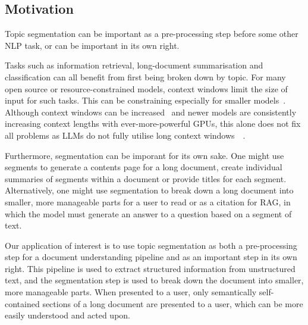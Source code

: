 \subsection{Motivation}

Topic segmentation can be important as a pre-processing step before some other NLP task, or can be important in its own right. 

Tasks such as information retrieval, long-document summarisation and classification can all benefit from first being broken down by topic. For many open source or resource-constrained models, context windows limit the size of input for such tasks. This can be constraining especially for smaller models~\cite{FlanT5}. Although context windows can be increased~\cite{ExtendingContextWindows} and newer models are consistently increasing context lengths with ever-more-powerful GPUs, this alone does not fix all problems as LLMs do not fully utilise long context windows~\cite{EffectOfLongContextWindows}~\cite{ContextAffectsFactual}. 

Furthermore, segmentation can be imporant for its own sake. One might use segments to generate a contents page for a long document, create individual summaries of segments within a document or provide titles for each segment. Alternatively, one might use segmentation to break down a long document into smaller, more manageable parts for a user to read or as a citation for RAG, in which the model must generate an answer to a question based on a segment of text.

Our application of interest is to use topic segmentation as both a pre-processing step for a document understanding pipeline and as an important step in its own right. This pipeline is used to extract structured information from unstructured text, and the segmentation step is used to break down the document into smaller, more manageable parts. When presented to a user, only semantically self-contained sections of a long document are presented to a user, which can be more easily understood and acted upon.